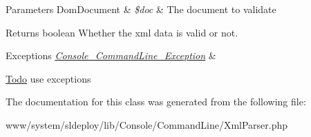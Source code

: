 \begin{DoxyParams}[1]{Parameters}
DomDocument & {\em \$doc} & The document to validate\\
\hline
\end{DoxyParams}
\begin{DoxyReturn}{Returns}
boolean Whether the xml data is valid or not. 
\end{DoxyReturn}

\begin{DoxyExceptions}{Exceptions}
{\em \hyperlink{class_console___command_line___exception}{Console\_\-CommandLine\_\-Exception}} & \\
\hline
\end{DoxyExceptions}
\begin{Desc}
\item[\hyperlink{todo__todo000006}{Todo}]use exceptions \end{Desc}


The documentation for this class was generated from the following file:\begin{DoxyCompactItemize}
\item 
www/system/sldeploy/lib/Console/CommandLine/XmlParser.php\end{DoxyCompactItemize}
